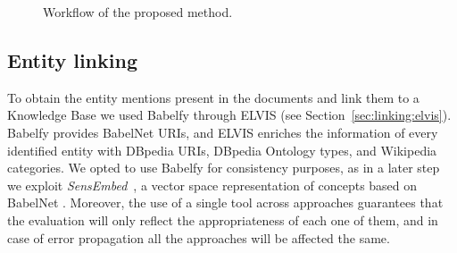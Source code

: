 \begin{figure}[!htp]
\centerline{}
\caption{Workflow of the proposed method.}
\label{fig:similarity:methodology}
\end{figure}

\subsection{Entity linking}

To obtain the entity mentions present in the documents and link them to a Knowledge Base we used Babelfy \citep{Moroetal2014b} through ELVIS (see Section~\ref{sec:linking:elvis}). Babelfy provides BabelNet URIs, and ELVIS enriches the information of every identified entity with DBpedia URIs, DBpedia Ontology types, and Wikipedia categories.
We opted to use Babelfy for consistency purposes, as in a later step we exploit \textit{SensEmbed}~\citep{Iacobaccietal2015}, a vector space representation of concepts based on BabelNet \citep{Navigli2010}. Moreover, the use of a single tool across approaches guarantees that the evaluation will only reflect the appropriateness of each one of them, and in case of error propagation all the approaches will be affected the same.

%


